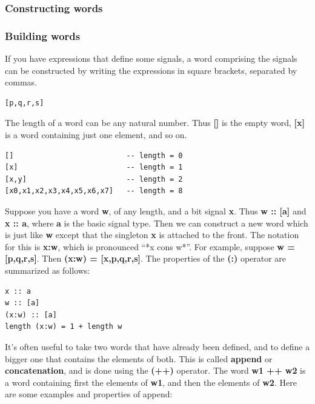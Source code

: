 \documentclass[]{svmono}
\begin{document}
\subsubsection*{Constructing words}
\label{sec:orgc72d8ce}
\subsubsection*{Building words}
\label{sec:org068ebb6}

If you have expressions that define some signals, a word comprising
the signals can be constructed by writing the expressions in square
brackets, separated by commas.


\begin{verbatim}
[p,q,r,s]
\end{verbatim}



The length of a word can be any natural number.  Thus \textbf{{[}]} is the
empty word, \textbf{{[}x]} is a word containing just one element, and so on.


\begin{verbatim}
[]                          -- length = 0
[x]                         -- length = 1
[x,y]                       -- length = 2
[x0,x1,x2,x3,x4,x5,x6,x7]   -- length = 8
\end{verbatim}


Suppose you have a word \textbf{w}, of any length, and a bit signal \textbf{x}.
Thus \textbf{w :: [a]} and \textbf{x :: a}, where \textbf{a} is the basic signal type.
Then we can construct a new word which is just like \textbf{w} except that
the singleton \textbf{x} is attached to the front.  The notation for this is
\textbf{x:w}, which is pronounced ``*x cons w*''.  For example, suppose \textbf{w =
{[}p,q,r,s]}.  Then \textbf{(x:w) = [x,p,q,r,s]}.  The properties of the \textbf{(:)}
operator are summarized as follows:


\begin{verbatim}
x :: a
w :: [a]
(x:w) :: [a]
length (x:w) = 1 + length w
\end{verbatim}


It's often useful to take two words that have already been defined,
and to define a bigger one that contains the elements of both.  This
is called \textbf{append} or \textbf{concatenation}, and is done using the
\textbf{(++)} operator.  The word \textbf{w1 ++ w2} is a word containing first the
elements of \textbf{w1}, and then the elements of \textbf{w2}.  Here are some
examples and properties of append:
\end{document}
